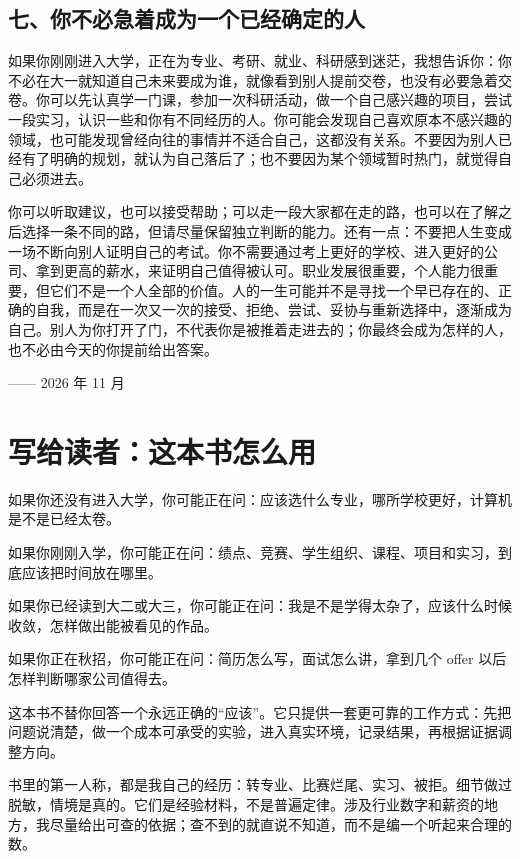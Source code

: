 \documentclass[UTF8,zihao=5,openany]{ctexbook}
\begin{document}
\section*{七、你不必急着成为一个已经确定的人}

如果你刚刚进入大学，正在为专业、考研、就业、科研感到迷茫，我想告诉你：你不必在大一就知道自己未来要成为谁，就像看到别人提前交卷，也没有必要急着交卷。你可以先认真学一门课，参加一次科研活动，做一个自己感兴趣的项目，尝试一段实习，认识一些和你有不同经历的人。你可能会发现自己喜欢原本不感兴趣的领域，也可能发现曾经向往的事情并不适合自己，这都没有关系。不要因为别人已经有了明确的规划，就认为自己落后了；也不要因为某个领域暂时热门，就觉得自己必须进去。

你可以听取建议，也可以接受帮助；可以走一段大家都在走的路，也可以在了解之后选择一条不同的路，但请尽量保留独立判断的能力。还有一点：不要把人生变成一场不断向别人证明自己的考试。你不需要通过考上更好的学校、进入更好的公司、拿到更高的薪水，来证明自己值得被认可。职业发展很重要，个人能力很重要，但它们不是一个人全部的价值。人的一生可能并不是寻找一个早已存在的、正确的自我，而是在一次又一次的接受、拒绝、尝试、妥协与重新选择中，逐渐成为自己。别人为你打开了门，不代表你是被推着走进去的；你最终会成为怎样的人，也不必由今天的你提前给出答案。

\vspace{0.4cm}
\noindent\hfill —— 2026 年 11 月

\clearpage

\chapter*{写给读者：这本书怎么用}
如果你还没有进入大学，你可能正在问：应该选什么专业，哪所学校更好，计算机是不是已经太卷。

如果你刚刚入学，你可能正在问：绩点、竞赛、学生组织、课程、项目和实习，到底应该把时间放在哪里。

如果你已经读到大二或大三，你可能正在问：我是不是学得太杂了，应该什么时候收敛，怎样做出能被看见的作品。

如果你正在秋招，你可能正在问：简历怎么写，面试怎么讲，拿到几个 offer 以后怎样判断哪家公司值得去。

这本书不替你回答一个永远正确的“应该”。它只提供一套更可靠的工作方式：先把问题说清楚，做一个成本可承受的实验，进入真实环境，记录结果，再根据证据调整方向。

书里的第一人称，都是我自己的经历：转专业、比赛烂尾、实习、被拒。细节做过脱敏，情境是真的。它们是经验材料，不是普遍定律。涉及行业数字和薪资的地方，我尽量给出可查的依据；查不到的就直说不知道，而不是编一个听起来合理的数。
\end{document}
